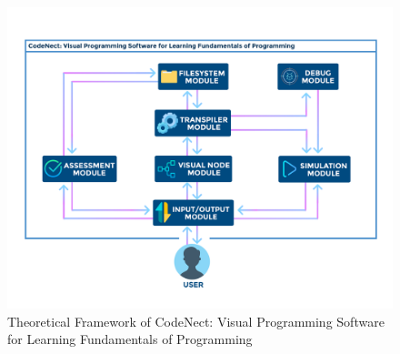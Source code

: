 \begin{doublespace}
\begin{center}
		\newpage
		\null\vfill
		\begin{figure}[H]
			\centering
			\includegraphics[width=\textwidth]{figures/theoretical_framework.png}
			\caption[Theoretical Framework]{Theoretical Framework of CodeNect: Visual Programming Software
			for Learning Fundamentals of Programming}
			\label{fig:theoretical_framework}
		\end{figure}
		\vfill

	\end{center}
\end{doublespace}
